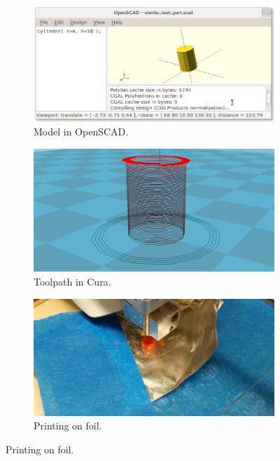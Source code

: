 \documentclass[fleqn,10pt]{wlpeerj}
\begin{document}
\begin{figure}
    \centering
    \begin{subfigure}[b]{0.32\textwidth}
        \centering
        \includegraphics[width=\textwidth]{test_part_openscad}
        \caption{Model in OpenSCAD.}
        \label{fig:openscad}
    \end{subfigure}
    \hfill
    \begin{subfigure}[b]{0.32\textwidth}
        \centering
        \includegraphics[width=\textwidth]{test_part_cura}
        \caption{Toolpath in Cura.}
        \label{fig:cura}
    \end{subfigure}
    \hfill
    \begin{subfigure}[b]{0.32\textwidth}
        \centering
        \includegraphics[width=\textwidth]{foil_printing}
        \caption{Printing on foil.}
        \label{fig:foil}
    \end{subfigure}


\end{figure}
\end{document}
